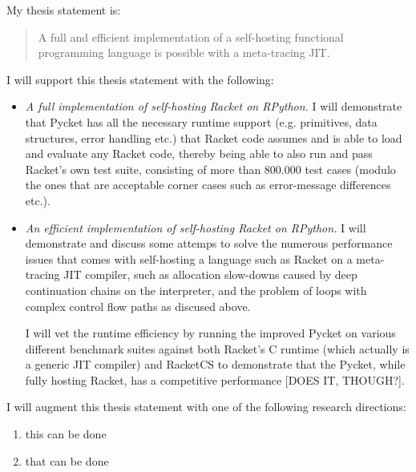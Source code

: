 My thesis statement is:

\begin{quote}
  A full and efficient implementation of a self-hosting functional
  programming language is possible with a meta-tracing JIT.
\end{quote}

I will support this thesis statement with the following:

\begin{itemize}
  \item \textit{A full implementation of self-hosting Racket on
    RPython.} I will demonstrate that Pycket has all the necessary
    runtime support (e.g. primitives, data structures, error handling
    etc.)  that Racket code assumes and is able to load and evaluate
    any Racket code, thereby being able to also run and pass Racket's
    own test suite, consisting of more than 800.000 test cases (modulo
    the ones that are acceptable corner cases such as error-message
    differences etc.).
  \item \textit{An efficient implementation of self-hosting Racket on
    RPython.} I will demonstrate and discuss some attemps to solve the
    numerous performance issues that comes with self-hosting a
    language such as Racket on a meta-tracing JIT compiler, such as
    allocation slow-downs caused by deep continuation chains on the
    interpreter, and the problem of loops with complex control flow
    paths as discused above.


    I will vet the runtime efficiency by running the improved Pycket
    on various different benchmark suites against both Racket's C
    runtime (which actually is a generic JIT compiler) and RacketCS to
    demonstrate that the Pycket, while fully hosting Racket, has a
    competitive performance [DOES IT, THOUGH?].
\end{itemize}

I will augment this thesis statement with one of the following research directions:

\begin{enumerate}
  \item this can be done
  \item that can be done
\end{enumerate}
